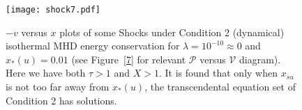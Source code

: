 \documentclass[fleqn,usenatbib]{mnras}
\begin{document}

\begin{figure}
\centering
\texttt{[image: shock7.pdf]}
\caption{$-v$ versus $x$ plots of some Shocks under Condition 2 (dynamical) isothermal MHD energy conservation for $\lambda=10^{-10}\approx 0$ and $x_{*}(u)=0.01$ (see Figure~\ref{7} for relevant $\mathcal{P}$ versus $\mathcal{V}$ diagram). Here we have both $\tau>1$ and $X>1$. It is found that only when $x_{su}$ is not too far away from $x_{*}(u)$, the transcendental equation set of Condition 2 has solutions.}
\label{1}
\end{figure}
\end{document}
